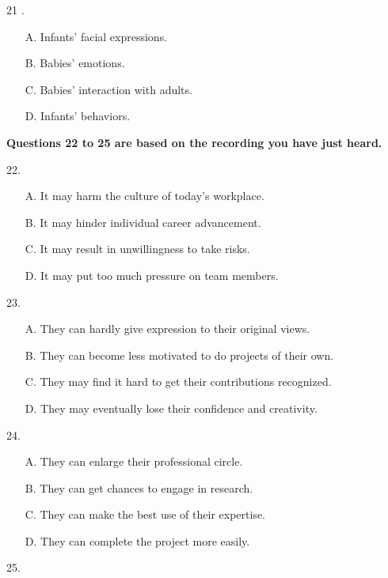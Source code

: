 \documentclass[UTF8,11pt]{ctexart}
\begin{document}
21 .


\begin{itemize}[leftmargin=2em,itemsep=.2em,topsep=.4em]\item[A.] Infants' facial expressions.
\item[B.] Babies' emotions.
\item[C.] Babies' interaction with adults.
\item[D.] Infants' behaviors.
\end{itemize}

\textbf{Questions 22 to 25 are based on the recording you have just heard.}


22.


\begin{itemize}[leftmargin=2em,itemsep=.2em,topsep=.4em]\item[A.] It may harm the culture of today's workplace.
\item[B.] It may hinder individual career advancement.
\item[C.] It may result in unwillingness to take risks.
\item[D.] It may put too much pressure on team members.
\end{itemize}

23.


\begin{itemize}[leftmargin=2em,itemsep=.2em,topsep=.4em]\item[A.] They can hardly give expression to their original views.
\item[B.] They can become less motivated to do projects of their own.
\item[C.] They may find it hard to get their contributions recognized.
\item[D.] They may eventually lose their confidence and creativity.
\end{itemize}

24.


\begin{itemize}[leftmargin=2em,itemsep=.2em,topsep=.4em]\item[A.] They can enlarge their professional circle.
\item[B.] They can get chances to engage in research.
\item[C.] They can make the best use of their expertise.
\item[D.] They can complete the project more easily.
\end{itemize}

25.
\end{document}
